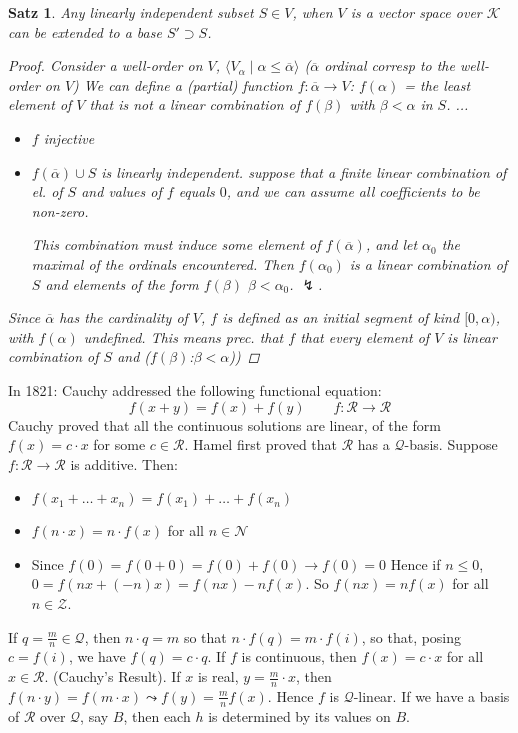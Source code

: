 \documentclass[headsepline=true,DIV=11]{scrartcl}
\newtheorem{theorem}{Satz}
\theoremstyle{definition}
\newenvironment{gelaber}{}{}
\renewcommand{\bar}[1]{\overline{#1}}
\begin{document}
\begin{theorem}
	Any linearly independent subset $S\in V$, when $V$ is a vector space over $\mathcal K$ can be extended to a base $S'\supset S$.
	\begin{proof}
		Consider a well-order on $V$, $\langle V_\alpha\mid \alpha\le \bar\alpha\rangle$ ($\bar\alpha$ ordinal corresp to the well-order on $V$)
		We can define a (partial) function $f\colon\bar\alpha\to V$:
		$f(\alpha)$ = the least element of $V$ that is not a linear combination of $f(\beta)$ with $\beta<\alpha$ in $S$.
		...
		\begin{itemize}
			\item $f$ injective
			\item $f(\bar\alpha)\cup S$ is linearly independent. suppose that a finite linear combination of el. of $S$ and values of $f$ equals $0$, and we can assume all coefficients to be non-zero.

			This combination must induce some element of $f(\bar\alpha)$, and let $\alpha_0$ the maximal of the ordinals encountered.
			Then $f(\alpha_0)$ is a linear combination of $S$ and elements of the form $f(\beta)$ $\beta<\alpha_0$. $\lightning$.
		\end{itemize}
		Since $\bar\alpha$ has the cardinality of $V$, $f$ is defined as an initial segment of kind $[0,\alpha)$, with $f(\alpha)$ undefined.
		This means prec. that $f$ that every element of $V$ is linear combination of $S$ and ($f(\beta)$:$\beta<\alpha$)) 
	\end{proof}
\end{theorem}

\begin{gelaber}
	In 1821: Cauchy addressed the following functional equation:
	\[f(x+y) = f(x)+f(y) \qquad f\colon \mathcal R\to \mathcal R\]
	Cauchy proved that all the continuous solutions are linear, of the form $f(x)=c\cdot x$ for some $c\in \mathcal R$.
	Hamel first proved that $\mathcal R$ has a $\mathcal Q$-basis.
	Suppose $f\colon \mathcal R\to \mathcal R$ is additive. Then:
	\begin{itemize}
		\item $f(x_1+\ldots+x_n)=f(x_1)+\ldots+f(x_n)$
		\item $f(n\cdot x) = n\cdot f(x)$ for all $n\in \mathcal N$
		\item Since $f(0)= f(0+0)=f(0)+f(0) \to  f(0)=0$ Hence if $n\le 0$, $0=f(nx+(-n)x)=f(nx)-nf(x)$.
			So $f(nx) = nf(x)$ for all $n\in \mathcal Z$.
	\end{itemize}
	If $q=\frac{m}{n}\in \mathcal Q$, then $n\cdot q=m$ so that $n\cdot f(q)=m\cdot f(i)$, so that, posing $c= f(i)$, we have $f(q)=c\cdot q$.
	If $f$ is continuous, then $f(x)=c\cdot x$ for all $x\in \mathcal R$. (Cauchy's Result).
	If $x$ is real, $y=\frac{m}{n}\cdot x$, then $f(n\cdot y)= f(m\cdot x) \leadsto f(y) = \frac{m}{n} f(x)$.
	Hence $f$ is $\mathcal Q$-linear.
	If we have a basis of $\mathcal R$ over $\mathcal Q$, say $B$, then each $h$ is determined by its values on $B$.
\end{gelaber}
\end{document}
